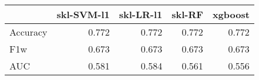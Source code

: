 \begin{tabular}{lrrrr}
\toprule
{} &  skl-SVM-l1 &  skl-LR-l1 &  skl-RF &  xgboost \\
\midrule
Accuracy &       0.772 &      0.772 &   0.772 &    0.772 \\
F1w      &       0.673 &      0.673 &   0.673 &    0.673 \\
AUC      &       0.581 &      0.584 &   0.561 &    0.556 \\
\bottomrule
\end{tabular}
